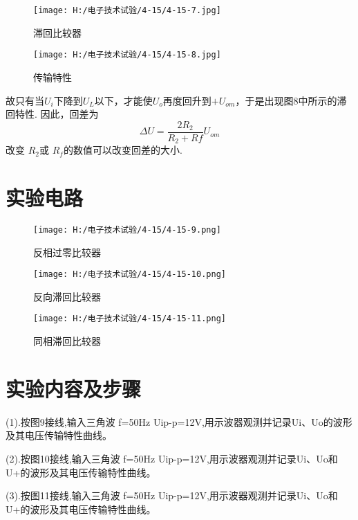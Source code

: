 \documentclass{article}
\begin{document}
               \begin{figure}[h]
                \begin{minipage}[t]{0.5\linewidth} %
                  \centering   
                  \texttt{[image: H:/电子技术试验/4-15/4-15-7.jpg]}   
                  \caption{滞回比较器}   
                  \label{fig:side:a}   
                \end{minipage}%
                \begin{minipage}[t]{0.5\linewidth}   
                  \centering   
                  \texttt{[image: H:/电子技术试验/4-15/4-15-8.jpg]}   
                  \caption{传输特性}   
                  \label{fig:side:b}   
                \end{minipage}   
              \end{figure}
              \par
              故只有当$U_i$下降到$U_L$以下，才能使$U_o$再度回升到$+U_{om}$，于是出现图8中所示的滞回特性. 因此，回差为\[\Delta U=\frac{2R_2}{R_2+Rf}U_{om}\]
改变 $R_2$或 $R_f$的数值可以改变回差的大小.\par 
\newpage
\section{ 实验电路}

\begin{figure}[h]
	\begin{minipage}[t]{0.5\linewidth} %
	  \centering   
	  \texttt{[image: H:/电子技术试验/4-15/4-15-9.png]}   
	  \caption{反相过零比较器}   
	  \label{fig:side:a}   
	\end{minipage}%
	\begin{minipage}[t]{0.5\linewidth}   
	  \centering   
	  \texttt{[image: H:/电子技术试验/4-15/4-15-10.png]}   
	  \caption{反向滞回比较器}   
	  \label{fig:side:b}   
	\end{minipage}   
  \end{figure}

\begin{figure}[h]
	\centering
	\texttt{[image: H:/电子技术试验/4-15/4-15-11.png]}
	\caption{同相滞回比较器} \label{fig:aa}
\end{figure}
\newpage
\section{ 实验内容及步骤}
(1).按图9接线,输入三角波 f=50Hz Uip-p=12V,用示波器观测并记录Ui、Uo的波形及其电压传输特性曲线。\par
(2).按图10接线,输入三角波 f=50Hz Uip-p=12V,用示波器观测并记录Ui、Uo和U+的波形及其电压传输特性曲线。\par
(3).按图11接线,输入三角波 f=50Hz Uip-p=12V,用示波器观测并记录Ui、Uo和U+的波形及其电压传输特性曲线。\par
	
\end{document}
